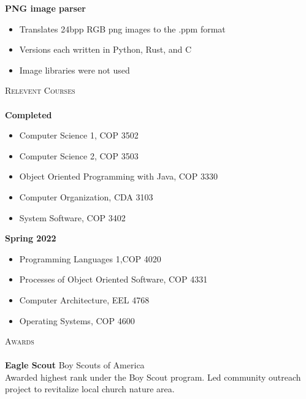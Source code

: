 \documentclass[a4paper]{article}
\newcommand{\lineunder} {
	\vspace*{-8pt} \\
	\hspace*{-18pt} \hrulefill \\
}
\newcommand{\header} [1] {
	{\hspace*{-18pt}\vspace*{6pt} \textsc{#1}}
	\vspace*{-6pt} \lineunder
}
\begin{document}
	\textbf{PNG image parser}
	\vspace{-2mm}
	\begin{itemize} \itemsep -3pt
		\item Translates 24bpp RGB png images to the .ppm format
		\item Versions each written in Python, Rust, and C
		\item Image libraries were not used
	\end{itemize}
	
	\vspace{2mm}
	

	\header{Relevent Courses}
	\textbf{Completed}
	\vspace{-2mm}
	\begin{itemize} \itemsep -3pt
		\item Computer Science 1, \hfill						COP 3502
		\item Computer Science 2, \hfill						COP 3503
		\item Object Oriented Programming with Java, \hfill		COP 3330
		\item Computer Organization, \hfill						CDA 3103
		\item System Software, \hfill							COP 3402
	\end{itemize}

	\textbf{Spring 2022}
	\vspace{-2mm}
	\begin{itemize} \itemsep -3pt
		\item Programming Languages 1,\hfill					COP 4020
		\item Processes of Object Oriented Software, \hfill		COP 4331
		\item Computer Architecture, \hfill						EEL 4768
		\item Operating Systems, \hfill							COP 4600
	\end{itemize}

	\vspace{2mm}




	\header{Awards}
	\textbf{Eagle Scout} \hfill Boy Scouts of America\\
	Awarded highest rank under the Boy Scout program. Led community outreach project to revitalize local church
	nature area.
	\vspace*{2mm}
\end{document}
